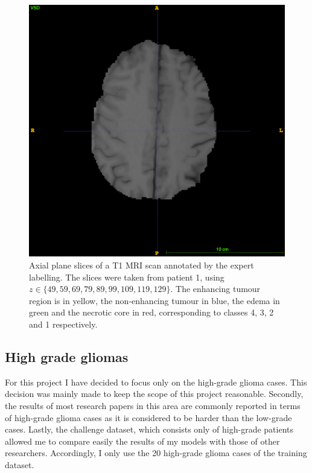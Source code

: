 \documentclass[12pt,a4paper,twoside,openright]{report}
\begin{document}
\begin{figure}
	\includegraphics[scale=0.1]{expert_segmentation_129}
	\caption[Slices of a T1 MRI scan annotated with the expert labelling.]{Axial plane slices of a T1 MRI scan annotated by the expert labelling. The slices were taken from patient 1, using $z \in \{49, 59, 69, 79, 89, 99, 109, 119, 129\}$. The enhancing tumour region is in yellow, the non-enhancing tumour in blue, the edema in green and the necrotic core in red, corresponding to classes 4, 3, 2 and 1 respectively.}
	\label{fig:expert_segmentations}
\end{figure}



\subsection{High grade gliomas}
For this project I have decided to focus only on the high-grade glioma cases. This decision was mainly made to keep the scope of this project reasonable. Secondly, the results of most research papers in this area are commonly reported in terms of high-grade glioma cases as it is considered to be harder than the low-grade cases. Lastly, the challenge dataset, which consists only of high-grade patients allowed me to compare easily the results of my models with those of other researchers. Accordingly, I only use the 20 high-grade glioma cases of the training dataset.
\end{document}
